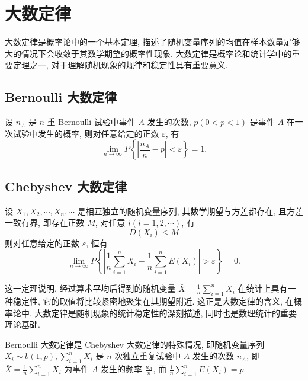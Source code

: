 \section{大数定律}

大数定律是概率论中的一个基本定理, 描述了随机变量序列的均值在样本数量足够大的情况下会收敛于其数学期望的概率性现象. 大数定律是概率论和统计学中的重要定理之一, 对于理解随机现象的规律和稳定性具有重要意义.

\subsection{Bernoulli 大数定律}

\begin{theorem}
    设 $ n_{A} $ 是 $ n $ 重 Bernoulli 试验中事件 $ A $ 发生的次数, $ p(0<   p<1  )$ 是事件 $ A $ 在一次试验中发生的概率, 则对任意给定的正数 $ \varepsilon $, 有
    $$\lim _{n \rightarrow \infty} P\left\{\left|\frac{n_{A}}{n}-p\right|<\varepsilon\right\}=1 .$$
\end{theorem}

\subsection{Chebyshev 大数定律}

\begin{theorem}
    设 $ X_{1}, X_{2}, \cdots, X_{n}, \cdots $ 是相互独立的随机变量序列, 其数学期望与方差都存在, 且方差一致有界, 即存在正数 $ M $, 对任意 $ i(i=1,2, \cdots) $, 有
    $$D\left(X_{i}\right) \leqslant M$$
    则对任意给定的正数 $ \varepsilon $, 恒有
    $$\lim _{n \rightarrow \infty} P\left\{\left|\frac{1}{n} \sum_{i=1}^{n} X_{i}-\frac{1}{n} \sum_{i=1}^{n} E\left(X_{i}\right)\right|>\varepsilon\right\}=0 .$$
\end{theorem}

这一定理说明, 经过算术平均后得到的随机变量 $\displaystyle \bar{X}=\frac{1}{n} \sum_{i=1}^{n} X_{i} $ 在统计上具有一种稳定性, 它的取值将比较紧密地聚集在其期望附近. 这正是大数定律的含义, 在概率论中, 大数定律是随机现象的统计稳定性的深刻描述, 同时也是数理统计的重要理论基础.

Bernoulli 大数定律是 Chebyshev 大数定律的特殊情况, 即随机变量序列 $\displaystyle X_{i} \sim b(1, p) ,  \sum_{i=1}^{n} X_{i} $ 是 $ n $ 次独立重复试验中 $ A $ 发生的次数 $ n_{A} $, 即 $\displaystyle \bar{X}=\frac{1}{n} \sum_{i=1}^{n} X_{i} $ 为事件 $ A $ 发生的频率 $\displaystyle \frac{n_{A}}{n} $, 而 $\displaystyle \frac{1}{n} \sum_{i=1}^{n} E\left(X_{i}\right)=p $.

